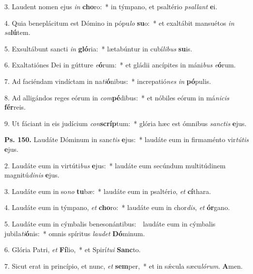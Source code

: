 3. Laudent nomen ejus \textit{in} \textbf{cho}ro:~* in týmpano, et psaltério \textit{psal}\textit{lant} \textbf{e}i.

4. Quia beneplácitum est Dómino in pópu\textit{lo} \textbf{su}o:~* et exaltábit mansuétos \textit{in} \textit{sa}\textbf{lú}tem.

5. Exsultábunt sancti \textit{in} \textbf{gló}ria:~* lætabúntur in cubí\textit{li}\textit{bus} \textbf{su}is.

6. Exaltatiónes Dei in gútture \textit{e}\textbf{ó}rum:~* et gládii ancípites in máni\textit{bus} \textit{e}\textbf{ó}rum.

7. Ad faciéndam vindíctam in na\textit{ti}\textbf{ó}nibus:~* increpatió\textit{nes} \textit{in} \textbf{pó}pulis.

8. Ad alligándos reges eórum in \textit{com}\textbf{pé}dibus:~* et nóbiles eórum in má\textit{ni}\textit{cis} \textbf{fér}reis.

9. Ut fáciant in eis judícium \textit{con}\textbf{scríp}tum:~* glória hæc est ómnibus \textit{sanc}\textit{tis} \textbf{e}jus.

\textbf{Ps. 150.} Laudáte Dóminum in sanc\textit{tis} \textbf{e}jus:~* laudáte eum in firmaménto vir\textit{tú}\textit{tis} \textbf{e}jus.

2. Laudáte eum in virtúti\textit{bus} \textbf{e}jus:~* laudáte eum secúndum multitúdinem magnitú\textit{di}\textit{nis} \textbf{e}jus.

3. Laudáte eum in so\textit{no} \textbf{tu}bæ:~* laudáte eum in psaltéri\textit{o}, \textit{et} \textbf{cí}thara.

4. Laudáte eum in týmpano, \textit{et} \textbf{cho}ro:~* laudáte eum in chor\textit{dis}, \textit{et} \textbf{ór}gano.

5. Laudáte eum in cýmbalis benesonántibus:~\GreDagger\ laudáte eum in cýmbalis jubila\textit{ti}\textbf{ó}nis:~* omnis spíritus \textit{lau}\textit{det} \textbf{Dó}minum.

6. Glória Patri, \textit{et} \textbf{Fí}lio,~* et Spirí\textit{tu}\textit{i} \textbf{Sanc}to.

7. Sicut erat in princípio, et nunc, \textit{et} \textbf{sem}per,~* et in s\'{\ae}cula sæcu\textit{ló}\textit{rum}. \textbf{A}men.